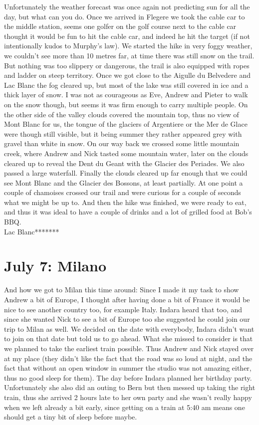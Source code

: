 Unfortunately the weather forecast was once again not predicting sun for all the day, but what can you do. Once we arrived in Flegere we took the cable car to the middle station, seems one golfer on the golf course next to the cable car thought it would be fun to hit the cable car, and indeed he hit the target (if not intentionally kudos to Murphy's law). We started the hike in very foggy weather, we couldn't see more than 10 metres far, at time there was still snow on the trail. But nothing was too slippery or dangerous, the trail is also equipped with ropes and ladder on steep territory. Once we got close to the Aigulle du Belvedere and Lac Blanc the fog cleared up, but most of the lake was still covered in ice and a thick layer of snow. I was not as courageous as Eve, Andrew and Pieter to walk on the snow though, but seems it was firm enough to carry multiple people. On the other side of the valley clouds covered the mountain top, thus no view of Mont Blanc for us, the tongue of the glaciers of Argentiere or the Mer de Glace were though still visible, but it being summer they rather appeared grey with gravel than white in snow. On our way back we crossed some little mountain creek, where Andrew and Nick tasted some mountain water, later on the clouds cleared up to reveal the Dent du Geant with the Glacier des Periades. We also passed a large waterfall. Finally the clouds cleared up far enough that we could see Mont Blanc and the Glacier des Bossons, at least partially. At one point a couple of chamoises crossed our trail and were curious for a couple of seconds what we might be up to. And then the hike was finished, we were ready to eat, and thus it was ideal to have a couple of drinks and a lot of grilled food at Bob's BBQ.\\

Lac Blanc*******

\section{July 7: Milano}
\label{Milano2013}

And how we got to Milan this time around: Since I made it my task to show Andrew a bit of Europe, I thought after having done a bit of France it would be nice to see another country too, for example Italy. Indara heard that too, and since she wanted Nick to see a bit of Europe too she suggested he could join our trip to Milan as well. We decided on the date with everybody, Indara didn't want to join on that date but told us to go ahead. What she missed to consider is that we planned to take the earliest train possible. Thus Andrew and Nick stayed over at my place (they didn't like the fact that the road was so loud at night, and the fact that without an open window in summer the studio was not amazing either, thus no good sleep for them). The day before Indara planned her birthday party. Unfortunately she also did an outing to Bern but then messed up taking the right train, thus she arrived 2 hours late to her own party and she wasn't really happy when we left already a bit early, since getting on a train at 5:40 am means one should get a tiny bit of sleep before maybe.\\

